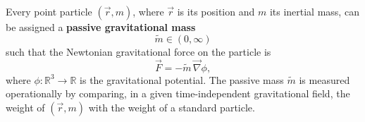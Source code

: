 Every point particle $(\vec{r}, m)$, where $\vec{r}$ is its position and $m$ its inertial mass, can be assigned a \textbf{passive gravitational mass}
$$\tilde{m} \in (0, \infty)$$
such that the Newtonian gravitational force on the particle is
$$\vec{F} = -\tilde{m}\,\vec{\nabla}\phi,$$
where $\phi: \mathbb{R}^3 \to \mathbb{R}$ is the gravitational potential. The passive mass $\tilde{m}$ is measured operationally by comparing, in a given time-independent gravitational field, the weight of $(\vec{r}, m)$ with the weight of a standard particle.
